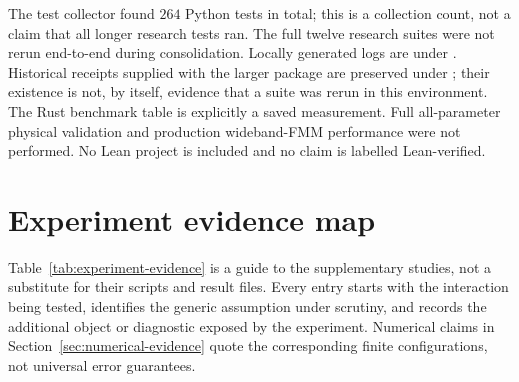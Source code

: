\documentclass[11pt,a4paper]{article}
\begin{document}
The test collector found $264$ Python tests in total; this is a collection count, not a claim that all longer research tests ran. The full twelve research suites were not rerun end-to-end during consolidation. Locally generated logs are under . Historical receipts supplied with the larger package are preserved under ; their existence is not, by itself, evidence that a suite was rerun in this environment. The Rust benchmark table is explicitly a saved measurement. Full all-parameter physical validation and production wideband-FMM performance were not performed. No Lean project is included and no claim is labelled Lean-verified.

\section{Experiment evidence map}
\label{app:experiment-map}

Table~\ref{tab:experiment-evidence} is a guide to the supplementary studies, not a substitute for their scripts and result files. Every entry starts with the interaction being tested, identifies the generic assumption under scrutiny, and records the additional object or diagnostic exposed by the experiment. Numerical claims in Section~\ref{sec:numerical-evidence} quote the corresponding finite configurations, not universal error guarantees.
\end{document}
